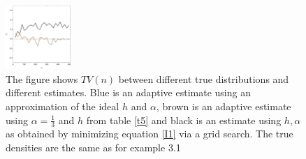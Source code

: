\documentclass[
twoside,
openright,
titlepage,
numbers=noenddot,
headinclude,%
footinclude=true,
dottedtoc, %
ngerman,
american, %
pagesize=pdftex,
]{book}
\begin{document}
\begin{example}
\begin{figure}[H]
			\includegraphics[width=0.22\textwidth]{figures/2DTVexamples/e3sn+t2}
			\caption{The figure shows $TV(n)$ between different true distributions and different estimates. Blue is an adaptive estimate using an approximation of the ideal $h$ and $\alpha$, brown is an adaptive estimate using $\alpha=\frac{1}{3}$ and $h$ from table \ref{t5} and black is an estimate using $h,\alpha$ as obtained by minimizing equation \eqref{I1} via a grid search. The true densities are the same as for example 3.1}
			\label{fig:e71}
		\end{figure}
	\end{example}
\end{document}
